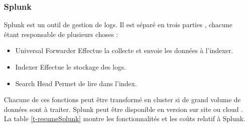 \documentclass[paper=a4, fontsize=11pt]{scrartcl}
\begin{document}
\justify

\subsubsection{Splunk}
Splunk est un outil de gestion de logs. Il est séparé en trois \og parties \fg, chacune étant responsable de plusieurs choses :

\begin{itemize}
    \item Universal Forwarder
    \subitem Effectue la collecte et envoie les données à l'indexer.
    \item Indexer
    \subitem Effectue le stockage des logs.
    \item Search Head
    \subitem Permet de lire dans l'index.
\end{itemize}
Chacune de ces fonctions peut être transformé en cluster si de grand volume de données sont à traiter.
Splunk peut être disponible en version \og sur site \fg ou \og cloud \fg. La table \ref{t-resumeSplunk} montre les fonctionnalités et les coûts relatif à Splunk.
\end{document}
